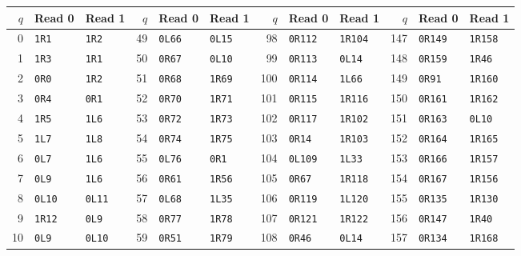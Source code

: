 \begingroup\footnotesize\setlength{\tabcolsep}{4pt}
\renewcommand{\arraystretch}{1.02}
\begin{center}
\begin{tabular}{@{}rll@{\hspace{12pt}}rll@{\hspace{12pt}}rll@{\hspace{12pt}}rll@{}}
\toprule
$q$ & Read 0 & Read 1 & $q$ & Read 0 & Read 1 & $q$ & Read 0 & Read 1 & $q$ & Read 0 & Read 1\\\midrule
0 & \texttt{1R1} & \texttt{1R2} & 49 & \texttt{0L66} & \texttt{0L15} & 98 & \texttt{0R112} & \texttt{1R104} & 147 & \texttt{0R149} & \texttt{1R158}\\
1 & \texttt{1R3} & \texttt{1R1} & 50 & \texttt{0R67} & \texttt{0L10} & 99 & \texttt{0R113} & \texttt{0L14} & 148 & \texttt{0R159} & \texttt{1R46}\\
2 & \texttt{0R0} & \texttt{1R2} & 51 & \texttt{0R68} & \texttt{1R69} & 100 & \texttt{0R114} & \texttt{1L66} & 149 & \texttt{0R91} & \texttt{1R160}\\
3 & \texttt{0R4} & \texttt{0R1} & 52 & \texttt{0R70} & \texttt{1R71} & 101 & \texttt{0R115} & \texttt{1R116} & 150 & \texttt{0R161} & \texttt{1R162}\\
4 & \texttt{1R5} & \texttt{1L6} & 53 & \texttt{0R72} & \texttt{1R73} & 102 & \texttt{0R117} & \texttt{1R102} & 151 & \texttt{0R163} & \texttt{0L10}\\
5 & \texttt{1L7} & \texttt{1L8} & 54 & \texttt{0R74} & \texttt{1R75} & 103 & \texttt{0R14} & \texttt{1R103} & 152 & \texttt{0R164} & \texttt{1R165}\\
6 & \texttt{0L7} & \texttt{1L6} & 55 & \texttt{0L76} & \texttt{0R1} & 104 & \texttt{0L109} & \texttt{1L33} & 153 & \texttt{0R166} & \texttt{1R157}\\
7 & \texttt{0L9} & \texttt{1L6} & 56 & \texttt{0R61} & \texttt{1R56} & 105 & \texttt{0R67} & \texttt{1R118} & 154 & \texttt{0R167} & \texttt{1R156}\\
8 & \texttt{0L10} & \texttt{0L11} & 57 & \texttt{0L68} & \texttt{1L35} & 106 & \texttt{0R119} & \texttt{1L120} & 155 & \texttt{0R135} & \texttt{1R130}\\
9 & \texttt{1R12} & \texttt{0L9} & 58 & \texttt{0R77} & \texttt{1R78} & 107 & \texttt{0R121} & \texttt{1R122} & 156 & \texttt{0R147} & \texttt{1R40}\\
10 & \texttt{0L9} & \texttt{0L10} & 59 & \texttt{0R51} & \texttt{1R79} & 108 & \texttt{0R46} & \texttt{0L14} & 157 & \texttt{0R134} & \texttt{1R168}\\

\end{tabular}
\end{center}
